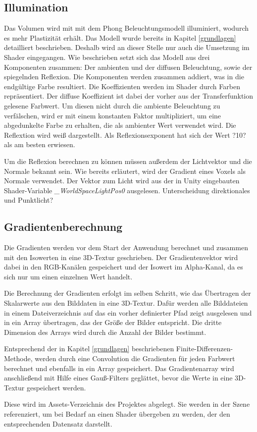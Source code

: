 \subsection{Illumination}
\label{illumination}

Das Volumen wird mit mit dem Phong Beleuchtungsmodell illuminiert, wodurch es mehr Plastizität erhält. Das Modell wurde bereits in Kapitel \ref{grundlagen} detailliert beschrieben. Deshalb wird an dieser Stelle nur auch die Umsetzung im Shader eingegangen.
Wie beschrieben setzt sich das Modell aus drei Komponenten zusammen: Der ambienten und der diffusen Beleuchtung, sowie der spiegelnden Reflexion. Die Komponenten werden zusammen addiert, was in die endgültige Farbe resultiert. 
Die Koeffizienten werden im Shader durch Farben repräsentiert. Der diffuse Koeffizient ist dabei der vorher aus der Transferfunktion gelesene Farbwert. Um diesen nicht durch die ambiente Beleuchtung zu verfälschen, wird er mit einem konstanten Faktor multipliziert, um eine abgedunkelte Farbe zu erhalten, die als ambienter Wert verwendet wird. Die Reflextion wird weiß dargestellt.
Als Reflexionsexponent hat sich der Wert ?10? als am besten erwiesen.

Um die Reflexion berechnen zu können müssen außerdem der Lichtvektor und die Normale bekannt sein.
Wie bereits erläutert, wird der Gradient eines Voxels als Normale verwendet. 
Der Vektor zum Licht wird aus der in Unity eingebauten Shader-Variable \textit{\_WorldSpaceLightPos0} ausgelesen.
Unterscheidung direktionales und Punktlicht?

\subsection{Gradientenberechnung}
\label{gradienten}


Die Gradienten werden vor dem Start der Anwendung berechnet und zusammen mit den Isowerten in eine 3D-Textur geschrieben. Der Gradientenvektor wird dabei in den RGB-Kanälen gespeichert und der Isowert im Alpha-Kanal, da es sich nur um einen einzelnen Wert handelt. 

Die Berechnung der Gradienten erfolgt im selben Schritt, wie das Übertragen der Skalarwerte aus den Bilddaten in eine 3D-Textur.
Dafür werden alle Bilddateien in einem Dateiverzeichnis auf das ein vorher definierter Pfad zeigt ausgelesen und in ein Array übertragen, das der Größe der Bilder entspricht. Die dritte Dimension des Arrays wird durch die Anzahl der Bilder bestimmt. 

Entsprechend der in Kapitel \ref{grundlagen} beschriebenen Finite-Differenzen-Methode, werden durch eine Convolution die Gradienten für jeden Farbwert berechnet und ebenfalls in ein Array gespeichert.
Das Gradientenarray wird anschließend mit Hilfe eines Gauß-Filters geglättet, bevor die Werte in eine 3D-Textur gespeichert werden. 

Diese wird im Assets-Verzeichnis des Projektes abgelegt. Sie werden in der Szene referenziert, um bei Bedarf an einen Shader übergeben zu werden, der den entsprechenden Datensatz darstellt. 